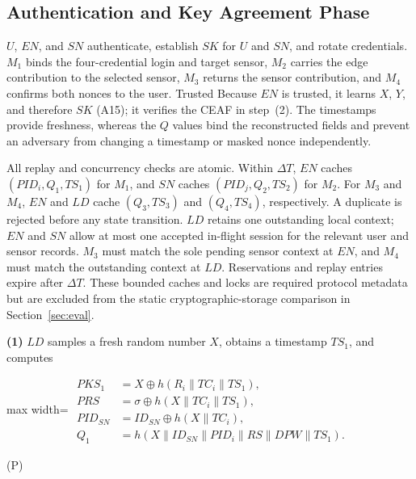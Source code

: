 \documentclass[cmc,article,submit,moreauthors,pdftex]{Definitions/tsp}
\newcommand{\cc}{\mathbin{\|}}
\newcounter{protoeq} %
\newenvironment{ceq}{%
  \refstepcounter{protoeq}%
  \par\vspace{-3pt}\setlength{\topsep}{0pt}\setlength{\partopsep}{0pt}\begin{center}%
}{%
  \hspace{0.45em}\textup{(P\theprotoeq)}%
  \end{center}\vspace{-3pt}%
} %
\providecommand{\DIFadd}[1]{{\protect\color{blue} \sf #1}} %
\providecommand{\DIFdel}[1]{{\protect\color{red} \scriptsize #1}} %
\providecommand{\DIFaddbegin}{} %
\providecommand{\DIFaddend}{} %
\providecommand{\DIFdelbegin}{} %
\providecommand{\DIFdelend}{} %
\begin{document}
\subsection{Authentication and Key Agreement Phase}\label{sec:aka}

$U$, $EN$, and $SN$ authenticate, establish $SK$ for $U$ and $SN$, and rotate credentials. $M_1$ binds the four-credential login and target sensor, $M_2$ carries the edge contribution to the selected sensor, $M_3$ returns the sensor contribution, and $M_4$ confirms both nonces to the user. \DIFdelbegin \DIFdel{Trusted }\DIFdelend \DIFaddbegin \DIFadd{Because }\DIFaddend $EN$ \DIFaddbegin \DIFadd{is trusted, it }\DIFaddend learns $X$, $Y$, and therefore $SK$ (A15); it verifies the CEAF in step~(2). The timestamps provide freshness, whereas the $Q$ values bind the reconstructed fields and prevent an adversary from changing a timestamp or masked nonce independently.

All replay and concurrency checks are atomic. Within $\Delta T$, $EN$ caches $(PID_i,Q_1,TS_1)$ for $M_1$, and $SN$ caches $(PID_j,Q_2,TS_2)$ for $M_2$. For $M_3$ and $M_4$, $EN$ and $LD$ cache $(Q_3,TS_3)$ and $(Q_4,TS_4)$, respectively. A duplicate is rejected before any state transition. $LD$ retains one outstanding local context; $EN$ and $SN$ allow at most one accepted in-flight session for the relevant user and sensor records. $M_3$ must match the sole pending sensor context at $EN$, and $M_4$ must match the outstanding context at $LD$. Reservations and replay entries expire after $\Delta T$. These bounded caches and locks are required protocol metadata but are excluded from the static cryptographic-storage comparison in Section~\ref{sec:eval}.

\textbf{(1)} $LD$ samples a fresh random number $X$, obtains a timestamp $TS_1$, and computes

\DIFdelbegin %
\DIFdelend \DIFaddbegin \begin{ceq}
\DIFaddend \begin{adjustbox}{max width=\columnwidth}
$\displaystyle\begin{aligned}
PKS_1 &= X \oplus h(R_i \cc TC_i \cc TS_1),\\
PRS &= \sigma \oplus h(X \cc TC_i \cc TS_1),\\
PID_{SN} &= ID_{SN} \oplus h(X \cc TC_i),\\
Q_1 &= h(X \cc ID_{SN} \cc PID_i \cc RS \cc DPW \cc TS_1).
\end{aligned}$
\end{adjustbox}
\DIFdelbegin %
\DIFdelend \DIFaddbegin \end{ceq}
\DIFaddend 
\end{document}
